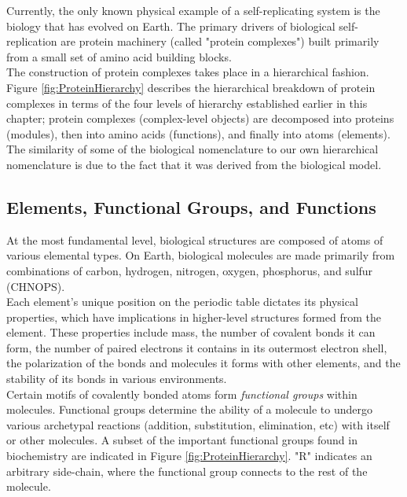 {Currently, the only known physical example of a self-replicating system is the biology that has evolved on Earth.  The primary drivers of biological self-replication are protein machinery (called "protein complexes") built primarily from a small set of amino acid building blocks.\\

The construction of protein complexes takes place in a hierarchical fashion.  Figure \ref{fig:ProteinHierarchy} describes the hierarchical breakdown of protein complexes in terms of the four levels of hierarchy established earlier in this chapter; protein complexes (complex-level objects) are decomposed into proteins (modules), then into amino acids (functions), and finally into atoms (elements).  The similarity of some of the biological nomenclature to our own hierarchical nomenclature is due to the fact that it was derived from the biological model.

\subsection{Elements, Functional Groups, and Functions}

At the most fundamental level, biological structures are composed of atoms of various elemental types.  On Earth, biological molecules are made primarily from combinations of carbon, hydrogen, nitrogen, oxygen, phosphorus, and sulfur (CHNOPS).\\

Each element's unique position on the periodic table dictates its physical properties, which have implications in higher-level structures formed from the element.  These properties include mass, the number of covalent bonds it can form, the number of paired electrons it contains in its outermost electron shell, the polarization of the bonds and molecules it forms with other elements, and the stability of its bonds in various environments.\\

Certain motifs of covalently bonded atoms form \textit{functional groups} within molecules.  Functional groups determine the ability of a molecule to undergo various archetypal reactions (addition, substitution, elimination, etc) with itself or other molecules.  A subset of the important functional groups found in biochemistry are indicated in Figure \ref{fig:ProteinHierarchy}.  "R" indicates an arbitrary side-chain, where the functional group connects to the rest of the molecule.\\

}

